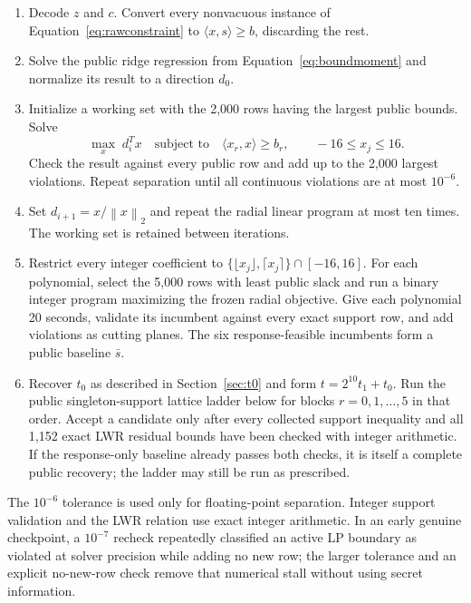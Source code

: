 \documentclass[11pt,a4paper]{article}
\newcommand{\norm}[1]{\left\lVert #1\right\rVert}
\begin{document}
\begin{enumerate}[leftmargin=1.7em]
  \item Decode $z$ and $c$.  Convert every nonvacuous instance of
        Equation~\eqref{eq:rawconstraint} to
        $\langle x,s\rangle\ge b$, discarding the rest.
  \item Solve the public ridge regression from
        Equation~\eqref{eq:boundmoment} and normalize its result to a
        direction $d_0$.
  \item Initialize a working set with the 2,000 rows having the largest
        public bounds.  Solve
        \[
             \max_x\; d_i^T x
             \quad\text{subject to}\quad
             \langle x_r,x\rangle\ge b_r,\qquad -16\le x_j\le16.
        \]
        Check the result against every public row and add up to the 2,000
        largest violations.  Repeat separation until all continuous
        violations are at most $10^{-6}$.
  \item Set $d_{i+1}=x/\norm{x}_2$ and repeat the radial linear program at
        most ten times.  The working set is retained between iterations.
  \item Restrict every integer coefficient to
        $\{\lfloor x_j\rfloor,\lceil x_j\rceil\}\cap[-16,16]$.  For each
        polynomial, select the 5,000 rows with least public slack and run a
        binary integer program maximizing the frozen radial objective.  Give
        each polynomial 20 seconds, validate its incumbent against every
        exact support row, and add violations as cutting planes.  The six
        response-feasible incumbents form a public baseline $\bar s$.
  \item Recover $t_0$ as described in Section~\ref{sec:t0} and form
        $t=2^{10}t_1+t_0$.  Run the public singleton-support lattice ladder
        below for blocks $r=0,1,\ldots,5$ in that order.  Accept a candidate
        only after every collected support inequality and all 1,152 exact LWR
        residual bounds have been checked with integer arithmetic.  If the
        response-only baseline already passes both checks, it is itself a
        complete public recovery; the ladder may still be run as prescribed.
\end{enumerate}

The $10^{-6}$ tolerance is used only for floating-point separation.  Integer
support validation and the LWR relation use exact integer arithmetic.  In an
early genuine checkpoint, a $10^{-7}$ recheck repeatedly classified an active
LP boundary as violated at solver precision while adding no new row; the
larger tolerance and an explicit no-new-row check remove that numerical
stall without using secret information.
\end{document}
